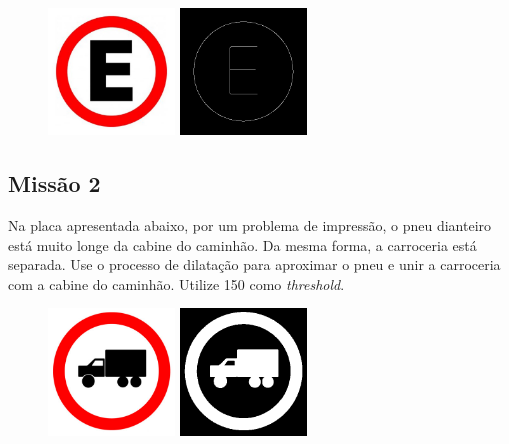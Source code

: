 \documentclass[
	12pt,				%
	oneside,			%
	a4paper,			%
	english,			%
	french,				%
	spanish,			%
	brazil,				%
	]{abntex2}
\begin{document}
\begin{apendicesenv}
\begin{figure}[H]
\centering
\includegraphics[width=0.3\textwidth]{imagens/transito/mission1_input.jpg}
\includegraphics[width=0.3\textwidth]{imagens/transito/mission1_output.png}
\end{figure}

\subsection{Missão 2}

Na placa apresentada abaixo, por um problema de impressão, o pneu dianteiro está muito longe da cabine do caminhão. Da mesma forma, a carroceria está separada. Use o processo de dilatação para aproximar o pneu e unir a carroceria com a cabine do caminhão. Utilize 150 como \textit{threshold}.

\begin{figure}[H]
\centering
\includegraphics[width=0.3\textwidth]{imagens/transito/mission2_input.jpg}
\includegraphics[width=0.3\textwidth]{imagens/transito/mission2_output.png}
\end{figure}


\end{apendicesenv}
\end{document}
